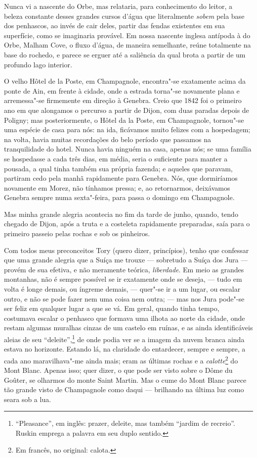 Nunca vi a nascente do Orbe, mas relataria, para conhecimento do leitor,
a beleza constante desses grandes cursos d'água que literalmente
\textit{sobem} pela base dos penhascos, ao invés de cair deles, partir das
fendas existentes em sua superfície, como se imaginaria provável. Em
nossa nascente inglesa antípoda à do Orbe, Malham Cove, o fluxo d'água,
de maneira semelhante, reúne totalmente na base do rochedo, e parece se
erguer até a saliência da qual brota a partir de um profundo lago
interior.

O velho Hôtel de la Poste, em Champagnole, encontra"-se exatamente
acima da ponte de Ain, em frente à cidade, onde a estrada torna"-se
novamente plana e arremessa"-se firmemente em direção à Genebra. Creio
que 1842 foi o primeiro ano em que alongamos o percurso a partir de
Dijon, com duas paradas depois de Poligny; mas posteriormente, o Hôtel
da la Poste, em Champagnole, tornou"-se uma espécie de casa para nós: na
ida, ficávamos muito felizes com a hospedagem; na volta, havia muitas
recordações do belo período que passamos na tranquilidade do hotel.
Nunca havia ninguém na casa, apenas nós; se uma família se hospedasse a
cada três dias, em média, seria o suficiente para manter a pousada, a
qual tinha também sua própria fazenda; e aqueles que paravam, partiram
cedo pela manhã rapidamente para Genebra. Nós, que dormiríamos novamente
em Morez, não tínhamos pressa; e, ao retornarmos, deixávamos Genebra
sempre numa sexta"-feira, para passa o domingo em Champagnole.

Mas minha grande alegria acontecia no fim da tarde de junho,
quando, tendo chegado de Dijon, após a truta e a costeleta rapidamente
preparadas, saía para o primeiro passeio pelas rochas e sob os
pinheiros.

Com todos meus preconceitos Tory (quero dizer, princípios), tenho que
confessar que uma grande alegria que a Suíça me trouxe --- sobretudo a
Suíça dos Jura --- provém de sua efetiva, e não meramente teórica,
\textit{liberdade}. Em meio as grandes montanhas, não é sempre possível se
ir exatamente onde se deseja, --- tudo em volta é longe demais, ou
íngreme demais, --- quer"-se ir a um lugar, ou escalar outro, e não se
pode fazer nem uma coisa nem outra; --- mas nos Jura pode"-se ser feliz em
qualquer lugar a que se vá. Em geral, quando tinha tempo, costumava
escalar o penhasco que formava uma ilhota ao norte da cidade, onde
restam algumas muralhas cinzas de um castelo em ruínas, e as ainda
identificáveis aleias de seu ``deleite'',\footnote{``Pleasance'', em
  inglês: prazer, deleite, mas também ``jardim de recreio''. Ruskin
  emprega a palavra em seu duplo sentido.} de onde podia
ver se a imagem da nuvem branca ainda estava no horizonte. Estando lá,
na claridade do entardecer, sempre e sempre, a cada ano maravilhava"-me
ainda mais; eram as últimas rochas e a \textit{calotte}\footnote{Em
  francês, no original: calota.} do Mont Blanc. Apenas
isso; quer dizer, o que pode ser visto sobre o Dôme du Goûter, se
olharmos do monte Saint Martin. Mas o cume do Mont Blanc parece tão
grande visto de Champagnole como daqui --- brilhando na última luz como
seara sob a lua.

